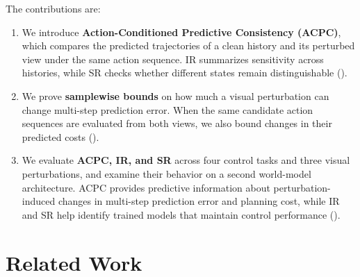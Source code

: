 \documentclass[10pt]{article}
\begin{document}
The contributions are:
\begin{enumerate}[leftmargin=1.4em]
  \item We introduce \textbf{Action-Conditioned Predictive Consistency
  (ACPC)}, which compares the predicted trajectories of a clean history and
  its perturbed view under the same action sequence. IR summarizes
  sensitivity across histories, while SR checks whether different states
  remain distinguishable ().
  \item We prove \textbf{samplewise bounds} on how much a visual perturbation
  can change multi-step prediction error. When the same candidate action
  sequences are evaluated from both views, we also bound changes in their
  predicted costs
  ().
  \item We evaluate \textbf{ACPC, IR, and SR} across four control tasks and
  three visual perturbations, and examine their behavior on a second
  world-model architecture. ACPC provides predictive information about
  perturbation-induced changes in multi-step prediction error and planning
  cost, while IR and SR help identify trained models that maintain control
  performance ().
\end{enumerate}
\section{Related Work}\label{sec:related}
\end{document}
